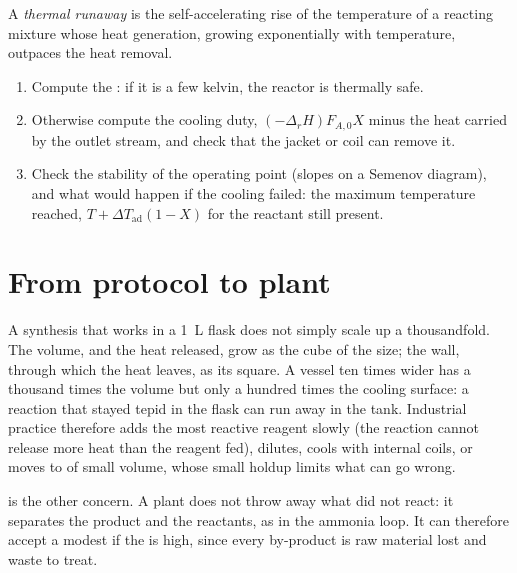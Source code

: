 \begin{definition}\label{def:b2:continuous-reactors:runaway}
A \emph{thermal runaway} is the self-accelerating
rise of the temperature of a reacting mixture whose heat generation, growing
exponentially with temperature, outpaces the heat removal.
\end{definition}

\begin{method}\label{met:b2:continuous-reactors:heat-balance}
\begin{enumerate}
  \item Compute the : if it is a few kelvin, the
        reactor is thermally safe.
  \item Otherwise compute the cooling duty, $(-\Delta_r H)F_{A,0}X$ minus the
        heat carried by the outlet stream, and check that the jacket or coil
        can remove it.
  \item Check the stability of the operating point (slopes on a Semenov
        diagram), and what would happen if the cooling failed: the
        maximum temperature reached, $T + \Delta T_{\text{ad}}(1 - X)$ for
        the reactant still present.
\end{enumerate}
\end{method}

\section{From protocol to plant}

A synthesis that works in a \qty{1}{L} flask does not simply scale up a
thousandfold. The volume, and the heat released, grow as the cube of the
size; the wall, through which the heat leaves, as its square. A vessel ten
times wider has a thousand times the volume but only a hundred times the
cooling surface: a reaction that stayed tepid in the flask can run away in
the tank. Industrial practice therefore adds the most reactive reagent
slowly (the reaction cannot release more heat than the reagent fed), dilutes,
cools with internal coils, or moves to  of small volume,
whose small holdup limits what can go wrong.

 is the other concern. A plant does not throw away what did not
react: it separates the product and  the reactants, as in the
ammonia loop. It can therefore accept a modest  if the
 is high, since every by-product is raw material lost and waste to
treat.

